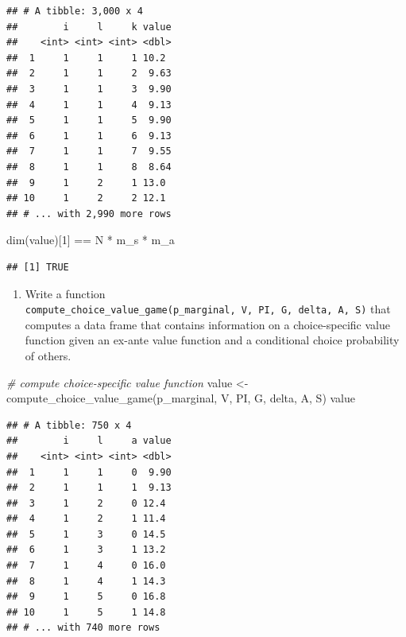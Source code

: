 \documentclass[
]{book}
\newenvironment{Shaded}{\begin{snugshade}}{\end{snugshade}}
\newcommand{\CommentTok}[1]{\textcolor[rgb]{0.56,0.35,0.01}{\textit{#1}}}
\newcommand{\DecValTok}[1]{\textcolor[rgb]{0.00,0.00,0.81}{#1}}
\newcommand{\FunctionTok}[1]{\textcolor[rgb]{0.00,0.00,0.00}{#1}}
\newcommand{\NormalTok}[1]{#1}
\newcommand{\OtherTok}[1]{\textcolor[rgb]{0.56,0.35,0.01}{#1}}
\newcommand{\SpecialCharTok}[1]{\textcolor[rgb]{0.00,0.00,0.00}{#1}}
\providecommand{\tightlist}{%
  \setlength{\itemsep}{0pt}\setlength{\parskip}{0pt}}
\begin{document}
\begin{verbatim}
## # A tibble: 3,000 x 4
##        i     l     k value
##    <int> <int> <int> <dbl>
##  1     1     1     1 10.2 
##  2     1     1     2  9.63
##  3     1     1     3  9.90
##  4     1     1     4  9.13
##  5     1     1     5  9.90
##  6     1     1     6  9.13
##  7     1     1     7  9.55
##  8     1     1     8  8.64
##  9     1     2     1 13.0 
## 10     1     2     2 12.1 
## # ... with 2,990 more rows
\end{verbatim}

\begin{Shaded}
\begin{Highlighting}[]
\FunctionTok{dim}\NormalTok{(value)[}\DecValTok{1}\NormalTok{] }\SpecialCharTok{==}\NormalTok{ N }\SpecialCharTok{*}\NormalTok{ m\_s }\SpecialCharTok{*}\NormalTok{ m\_a}
\end{Highlighting}
\end{Shaded}

\begin{verbatim}
## [1] TRUE
\end{verbatim}

\begin{enumerate}
\def\labelenumi{\arabic{enumi}.}
\setcounter{enumi}{8}
\tightlist
\item
  Write a function \texttt{compute\_choice\_value\_game(p\_marginal,\ V,\ PI,\ G,\ delta,\ A,\ S)} that computes a data frame that contains information on a choice-specific value function given an ex-ante value function and a conditional choice probability of others.
\end{enumerate}

\begin{Shaded}
\begin{Highlighting}[]
\CommentTok{\# compute choice{-}specific value function}
\NormalTok{value }\OtherTok{\textless{}{-}} \FunctionTok{compute\_choice\_value\_game}\NormalTok{(p\_marginal, V, PI, G, delta, A, S)}
\NormalTok{value}
\end{Highlighting}
\end{Shaded}

\begin{verbatim}
## # A tibble: 750 x 4
##        i     l     a value
##    <int> <int> <int> <dbl>
##  1     1     1     0  9.90
##  2     1     1     1  9.13
##  3     1     2     0 12.4 
##  4     1     2     1 11.4 
##  5     1     3     0 14.5 
##  6     1     3     1 13.2 
##  7     1     4     0 16.0 
##  8     1     4     1 14.3 
##  9     1     5     0 16.8 
## 10     1     5     1 14.8 
## # ... with 740 more rows
\end{verbatim}
\end{document}
